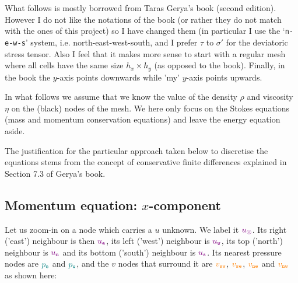 What follows is mostly borrowed from Taras Gerya's book (second edition). 
However I do not like the notations of the book (or rather they do not match
with the ones of this project) so I have changed them (in particular I use 
the `{\tt n-e-w-s}' system, i.e. north-east-west-south, 
and I prefer $\tau$ to  $\sigma'$ for the deviatoric stress tensor.
Also I feel that it makes more sense to start with a regular mesh 
where all cells have the same size $h_x \times h_y$ (as opposed to the book).
Finally, in the book the $y$-axis points downwards while 'my' $y$-axis 
points upwards.

In what follows we assume that we know the value of the density $\rho$
and viscosity $\eta$ on the (black) nodes of the mesh. We here only focus on the 
Stokes equations (mass and momentum conservation equations) and leave the energy
equation aside.

The justification for the particular approach taken below to 
discretise the equations stems from the concept of conservative 
finite differences explained in Section 7.3 of Gerya's book. 


\subsection{Momentum equation: $x$-component}

Let us zoom-in on a node which carries a $u$ unknown. 
We label it ${\color{violet}u_\otimes}$. Its right ('east')  
neighbour is then ${\color{violet}u_{\tt e}}$,
its left ('west') neighbour is ${\color{violet}u_{\tt w}}$, 
its top ('north') neighbour is ${\color{violet}u_{\tt n}}$ and 
its bottom ('south') neighbour is ${\color{violet}u_{\tt s}}$.
Its nearest pressure nodes are ${\color{teal}p_{\tt e}}$ and 
${\color{teal}p_{\tt w}}$, and the $v$ nodes
that surround it are ${\color{orange}v_{\tt sw}}$, 
${\color{orange}v_{\tt se}}$, ${\color{orange}v_{\tt ne}}$ and 
${\color{orange}v_{\tt nw}}$ as shown here:


